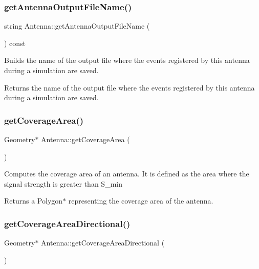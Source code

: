 \mbox{\label{class_antenna_a7a3919b137b91c1f8f13d620bc7657ed}} 
\subsubsection{\texorpdfstring{getAntennaOutputFileName()}{getAntennaOutputFileName()}}
{\footnotesize\ttfamily string Antenna\+::get\+Antenna\+Output\+File\+Name (\begin{DoxyParamCaption}{ }\end{DoxyParamCaption}) const}

Builds the name of the output file where the events registered by this antenna during a simulation are saved. \begin{DoxyReturn}{Returns}
the name of the output file where the events registered by this antenna during a simulation are saved. 
\end{DoxyReturn}
\mbox{\label{class_antenna_a5f94dd903add1b59957514887388bd52}} 
\subsubsection{\texorpdfstring{getCoverageArea()}{getCoverageArea()}}
{\footnotesize\ttfamily Geometry$\ast$ Antenna\+::get\+Coverage\+Area (\begin{DoxyParamCaption}{ }\end{DoxyParamCaption})}

Computes the coverage area of an antenna. It is defined as the area where the signal strength is greater than S\+\_\+min \begin{DoxyReturn}{Returns}
a Polygon$\ast$ representing the coverage area of the antenna. 
\end{DoxyReturn}
\mbox{\label{class_antenna_af5e3d353fcc340b963181514b55bf715}} 
\subsubsection{\texorpdfstring{getCoverageAreaDirectional()}{getCoverageAreaDirectional()}}
{\footnotesize\ttfamily Geometry$\ast$ Antenna\+::get\+Coverage\+Area\+Directional (\begin{DoxyParamCaption}{ }\end{DoxyParamCaption})\hspace{0.3cm}{\ttfamily [private]}}

